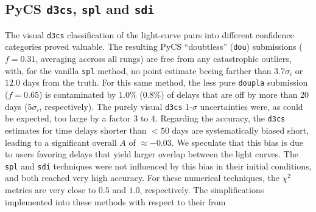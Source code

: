 \documentclass[traditabstract]{aa}
\begin{document}
\subsection{PyCS {\tt d3cs}, {\tt spl} and {\tt sdi}}

The visual {\tt d3cs} classification of the light-curve pairs into different confidence categories proved valuable. The resulting PyCS ``doubtless'' ({\tt dou}) submissions ($f=0.31$, averaging accross all rungs) are free from any catastrophic outliers, with, for the vanilla {\tt spl} method, no point estimate beeing farther than $3.7 \sigma_i$ or $12.0$ days from the truth. For this same method, the less pure {\tt doupla} submission ($f=0.65$) is contaminated by $1.0\%$ ($0.8 \%$) of delays that are off by more than 20 days ($5 \sigma_i$, respectively). The purely visual {\tt d3cs} 1-$\sigma$ uncertainties were, as could be expected, too large by a factor 3 to 4. Regarding the accuracy, the {\tt d3cs} estimates for time delays shorter than $< 50$ days are systematically biased short, leading to a significant overall $A$ of $\approx -0.03$. We speculate that this bias is due to users favoring delays that yield larger overlap between the light curves. The {\tt spl} and {\tt sdi} techniques were not influenced by this bias in their initial conditions, and both reached very high accuracy. For these numerical techniques, the $\chi^2$ metrics are very close to $0.5$ and $1.0$, respectively. The simplifications implemented into these methods with respect to their from \citet{pycs}













\end{document}
